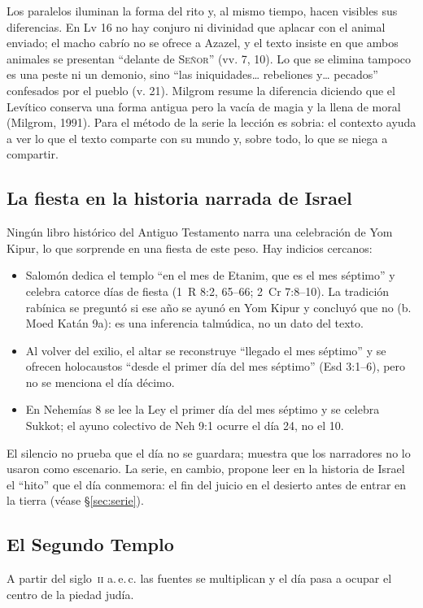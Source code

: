 \documentclass[11pt,letterpaper]{article}
\newcommand{\SENOR}{\textsc{Señor}}
\begin{document}
Los paralelos iluminan la forma del rito y, al mismo tiempo, hacen visibles sus diferencias. En Lv 16 no hay conjuro ni divinidad que aplacar con el animal enviado; el macho cabrío no se ofrece a Azazel, y el texto insiste en que ambos animales se presentan ``delante de \SENOR'' (vv. 7, 10). Lo que se elimina tampoco es una peste ni un demonio, sino ``las iniquidades\ldots{} rebeliones y\ldots{} pecados'' confesados por el pueblo (v. 21). Milgrom resume la diferencia diciendo que el Levítico conserva una forma antigua pero la vacía de magia y la llena de moral (Milgrom, 1991). Para el método de la serie la lección es sobria: el contexto ayuda a ver lo que el texto comparte con su mundo y, sobre todo, lo que se niega a compartir.

\subsection{La fiesta en la historia narrada de Israel}
Ningún libro histórico del Antiguo Testamento narra una celebración de Yom Kipur, lo que sorprende en una fiesta de este peso. Hay indicios cercanos:
\begin{itemize}\setlength{\itemsep}{1pt}
\item Salomón dedica el templo ``en el mes de Etanim, que es el mes séptimo'' y celebra catorce días de fiesta (1~R 8:2, 65--66; 2~Cr 7:8--10). La tradición rabínica se preguntó si ese año se ayunó en Yom Kipur y concluyó que no (b. Moed Katán 9a): es una inferencia talmúdica, no un dato del texto.
\item Al volver del exilio, el altar se reconstruye ``llegado el mes séptimo'' y se ofrecen holocaustos ``desde el primer día del mes séptimo'' (Esd 3:1--6), pero no se menciona el día décimo.
\item En Nehemías 8 se lee la Ley el primer día del mes séptimo y se celebra Sukkot; el ayuno colectivo de Neh 9:1 ocurre el día 24, no el 10.
\end{itemize}
El silencio no prueba que el día no se guardara; muestra que los narradores no lo usaron como escenario. La serie, en cambio, propone leer en la historia de Israel el ``hito'' que el día conmemora: el fin del juicio en el desierto antes de entrar en la tierra (véase §\ref{sec:serie}).

\subsection{El Segundo Templo}
A partir del siglo~\textsc{ii} a.\,e.\,c. las fuentes se multiplican y el día pasa a ocupar el centro de la piedad judía.
\end{document}
